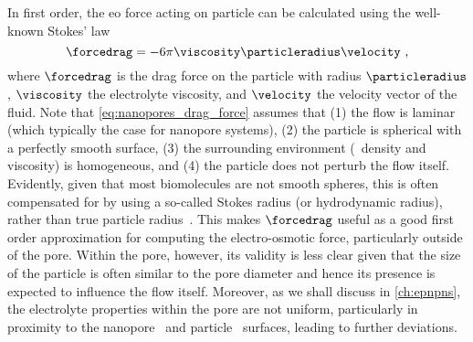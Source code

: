 In first order, the \gls{eo} force acting on particle can be calculated using the well-known Stokes' law
%
\begin{equation}\label{eq:nanopores_drag_force}
  \forcedrag = - 6 \pi \viscosity \particleradius \velocity
  \text{ ,}
\end{equation}
%
where $\forcedrag$ is the drag force on the particle with radius $\particleradius$, $\viscosity$ the
electrolyte viscosity, and $\velocity$ the velocity vector of the fluid. Note that
\cref{eq:nanopores_drag_force} assumes that (1) the flow is laminar (which typically the case for nanopore
systems\footnotemark),%
%
%
%
 (2) the particle is spherical with a perfectly smooth surface, (3) the surrounding environment (\ie~density
and viscosity) is homogeneous, and (4) the particle does not perturb the flow itself. Evidently, given that
most biomolecules are not smooth spheres, this is often compensated for by using a so-called Stokes radius (or
hydrodynamic radius), rather than true particle radius~\cite{Ortega-2011}. This makes $\forcedrag$ useful as a
good first order approximation for computing the electro-osmotic force, particularly outside of the pore.
Within the pore, however, its validity is less clear given that the size of the particle is often similar to
the pore diameter and hence its presence is expected to influence the flow itself. Moreover, as we shall
discuss in \cref{ch:epnpns}, the electrolyte properties within the pore are not uniform, particularly in
proximity to the nanopore~\cite{Qiao-Aluru-2003,Vo-2016,Hsu-2017,Ye-2011} and
particle~\cite{Pronk-2014,Makarov-1998} surfaces, leading to further deviations.

